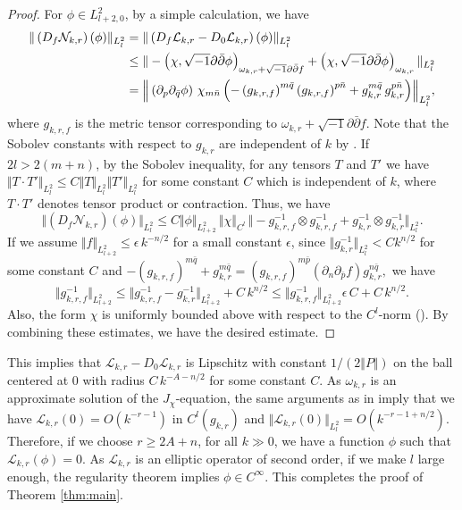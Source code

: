 \documentclass{amsart}
\numberwithin{equation}{section}
\theoremstyle{plain}
\theoremstyle{definition}
\theoremstyle{remark}
\begin{document}
\begin{proof}
 For $\phi \in L^2_{l+2,0}$, by a simple calculation, we have
\begin{align*}
\Vert \left( D_f \mathcal{N}_{k,r} \right) (\phi) \Vert_{L^2_l}
&= \Vert \left( D_f \mathcal{L}_{k,r} - D_0 \mathcal{L}_{k,r} \right) (\phi) \Vert_{L^2_l}\\
&\le \Vert -\left( \chi, \sqrt{-1} \partial \bar{\partial} \phi \right)_{\omega_{k,r}+\sqrt{-1} \partial \bar{\partial} f} + \left(\chi, \sqrt{-1} \partial \bar{\partial} \phi \right)_{\omega_{k,r}} \Vert_{L^2_l} \\
&= \Big\Vert \left( \partial_p \partial_{\bar{q}} \phi \right) \, \chi_{m \bar{n}} \, \Bigl( -\left(g_{k,r,f} \right)^{m \bar{q}} \left(g_{k,r,f} \right)^{p \bar{n}} + g_{k,r}^{m \bar{q}} \, g_{k,r}^{p \bar{n}} \Bigr) \Big\Vert_{L^2_l},
\end{align*}
where $g_{k,r,f}$ is the metric tensor corresponding to $\omega_{k,r} + \sqrt{-1} \partial \bar{\partial} f$.
Note that the Sobolev constants with respect to $g_{k,r}$ are independent of $k$ by \cite[Lemma 5.8]{Fine}. If $2l > 2(m+n)$, by the Sobolev inequality, for any tensors $T$ and $T'$ we have
$\Vert T \cdot T' \Vert_{L^2_l} \le C \Vert T \Vert_{L^2_l} \Vert T' \Vert_{L^2_l}$ for some constant $C$ which is independent of $k$, where $T \cdot T'$ denotes tensor product or contraction. Thus, we have
$$\Vert \left( D_f \mathcal{N}_{k,r} \right) (\phi) \Vert_{L^2_l}
\le
C \Vert \phi \Vert_{L^2_{l+2}} \, \Vert \chi \Vert_{C^l} \, \Vert - g^{-1}_{k,r,f} \otimes g^{-1}_{k,r,f} + g^{-1}_{k,r} \otimes g^{-1}_{k,r} \Vert_{L^2_l}.
$$
If we assume $ \Vert f \Vert_{L^2_{l+2}} \le \epsilon \, k^{-n/2}$ for a small constant $\epsilon$, 
since $\Vert g^{-1}_{k,r} \Vert_{L^2_l} < C k^{n/2}$ for some constant $C$ and 
$-\left(g_{k,r,f}\right)^{m \bar{q}} + g_{k,r}^{m \bar{q}} 
= \left(g_{k,r,f}\right)^{m \bar{p}} \left( \partial_n \partial_{\bar{p}} f \right) g_{k,r}^{n \bar{q}},
$
 we have
$$ \Vert g_{k,r,f}^{-1} \Vert_{L^2_{l+2}} 
\le \Vert g_{k,r,f}^{-1} - g_{k,r}^{-1} \Vert_{L^2_{l+2}} +C \, k^{n/2}
\le \Vert g_{k,r,f}^{-1} \Vert_{L^2_{l+2}} \epsilon \, C +C \, k^{n/2}.
$$
Also, the form $\chi$ is uniformly bounded above with respect to the $C^l$-norm (\cite[Lemma 5.6]{Fine}). 
By combining these estimates, we have the desired estimate.
\end{proof}

This implies that $\mathcal{L}_{k,r} - D_0\mathcal{L}_{k,r}$ is Lipschitz with constant $1/\left(2\Vert P \Vert\right)$ on the ball centered at $0$ with radius $C \, k^{-A-n/2}$ for some constant $C$. 
As $\omega_{k,r}$ is an approximate solution of the $J_\chi$-equation, the same arguments as in \cite[Lemmas 5.6 and 5.7]{Fine} imply that we have $\mathcal{L}_{k,r}(0) = O\left(k^{-r-1} \right)$ in $C^l(g_{k,r})$ and $\Vert \mathcal{L}_{k,r}(0) \Vert_{L^2_l} = O \left(k^{-r-1+{n/2}} \right)$.
Therefore, if we choose $r \ge  2A + n $, for all $k \gg 0$, we have a function $\phi$ such that $\mathcal{L}_{k,r}(\phi) = 0$. As $\mathcal{L}_{k,r}$ is an elliptic operator of second order, if we make $l$ large enough, the regularity theorem implies $\phi \in C^\infty$. This completes the proof of Theorem \ref{thm:main}. 
\end{document}
